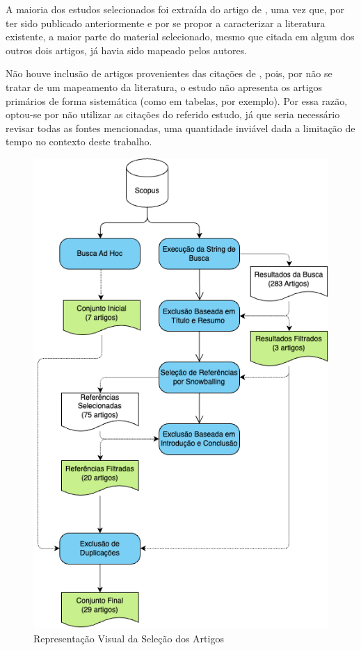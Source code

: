 A maioria dos estudos selecionados foi extraída do artigo de , uma vez que, por ter sido publicado anteriormente e por se propor a caracterizar a literatura existente, a maior parte do material selecionado, mesmo que citada em algum dos outros dois artigos, já havia sido mapeado pelos autores.

Não houve inclusão de artigos provenientes das citações de , pois, por não se tratar de um mapeamento da literatura, o estudo não apresenta os artigos primários de forma sistemática (como em tabelas, por exemplo). Por essa razão, optou-se por não utilizar as citações do referido estudo, já que seria necessário revisar todas as fontes mencionadas, uma quantidade inviável dada a limitação de tempo no contexto deste trabalho.



\begin{figure}
    \centering
    \caption{Representação Visual da Seleção dos Artigos}
    \includegraphics[width=0.7\linewidth]{figuras/selecao.png}
    \begin{center}
    \end{center}
    \label{fig:selecao}
\end{figure}

